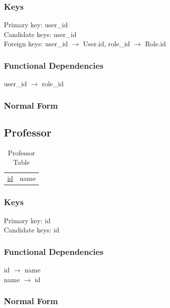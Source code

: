 \documentclass[11pt]{article}
\begin{document}
\subsubsection{Keys}
\label{sec-3-3-1}

    
    Primary key: user\_id\\
    Candidate keys: user\_id\\
    Foreign keys: user\_id $\rightarrow$ User.id, role\_id $\rightarrow$ Role.id
\subsubsection{Functional Dependencies}
\label{sec-3-3-2}


    user\_id $\rightarrow$ role\_id
    
\subsubsection{Normal Form}
\label{sec-3-3-3}
\subsection{Professor}
\label{sec-3-4}


\begin{table}[htb]
\caption{Professor Table} 
\begin{center}
\begin{tabular}{ll}
 \underline{id}  &  name  \\
\end{tabular}
\end{center}
\end{table}
\subsubsection{Keys}
\label{sec-3-4-1}

    
    Primary key: id\\
    Candidate keys: id
\subsubsection{Functional Dependencies}
\label{sec-3-4-2}


    id $\rightarrow$ name\\
    name $\rightarrow$ id
    
\subsubsection{Normal Form}
\label{sec-3-4-3}
\end{document}
